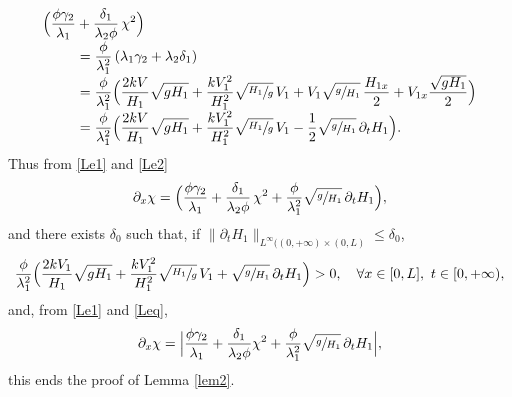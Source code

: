 \documentclass[JEP,XML,SOM,Unicode]{cedram}
\theoremstyle{definition}
\begin{document}
\begin{equation}
\begin{split}
\Bigl(\frac{\phi\gamma_{2}}{\lambda_{1}}&+\frac{\delta_{1}}{\lambda_{2}\phi}\,\chi^{2}\Bigr)\\[-3pt]
&=\frac{\phi}{\lambda_{1}^{2}}\left(\lambda_{1}\gamma_{2}+\lambda_{2}\delta_{1}\right)\\[-3pt]
&=\frac{\phi}{\lambda_{1}^{2}} \Bigl(\frac{2kV}{H_{1}}\sqrt{gH_{1}}+\frac{kV_{1}^{2}}{H_{1}^{2}}\sqrt{\sfrac{H_{1}}{g}}\,V_{1}+V_{1}\sqrt{\sfrac{g}{H_{1}}}\,\frac{H_{1x}}{2}+V_{1x}\frac{\sqrt{gH_{1}}}{2} \Bigr)\\[-3pt]
&=\frac{\phi}{\lambda_{1}^{2}} \Bigl(\frac{2kV}{H_{1}}\sqrt{gH_{1}}+\frac{kV_{1}^{2}}{H_{1}^{2}}\sqrt{\sfrac{H_{1}}{g}}\,V_{1}-\frac{1}{2}\sqrt{\sfrac{g}{H_{1}}}\,\partial_{t}H_{1} \Bigr).
\end{split}
\label{Le2}
\end{equation}
Thus from \eqref{Le1} and \eqref{Le2}
\begin{equation}
\partial_{x}\chi= \Bigl(\frac{\phi\gamma_{2}}{\lambda_{1}}+\frac{\delta_{1}}{\lambda_{2}\phi}\,\chi^{2}+{\frac{\phi}{\lambda_{1}^{2}}}\sqrt{\sfrac{g}{H_{1}}}\,\partial_{t}H_{1} \Bigr),
\label{Leq}
\end{equation}
{and} there exists $\delta_{0}$ such that, if $\lVert \partial_{t}H_{1}\rVert_{L^{\infty}((0,+\infty)\times(0,L)}\leq \delta_{0}$,
\begin{equation*}
\frac{\phi}{\lambda_{1}^{2}} \Bigl(\frac{2kV_{1}}{H_{1}}\sqrt{gH_{1}}+\frac{kV_{1}^{2}}{H_{1}^{2}}\sqrt{\sfrac{H_{1}}{g}}\,V_{1}+\sqrt{\sfrac{g}{H_{1}}}\,\partial_{t}H_{1} \Bigr)>0,\quad\forall x\in[0,L],\ t\in[0,+\infty),
\end{equation*}
and, from \eqref{Le1} and \eqref{Leq},
\begin{equation*}
\partial_{x}\chi= \Bigl |\frac{\phi\gamma_{2}}{\lambda_{1}}+\frac{\delta_{1}}{\lambda_{2}\phi}\chi^{2}+{\frac{\phi}{\lambda_{1}^{2}}}\sqrt{\sfrac{g}{H_{1}}}\,\partial_{t}H_{1} \Bigr|,
\end{equation*}
this ends the proof of Lemma \ref{lem2}.
\end{document}
